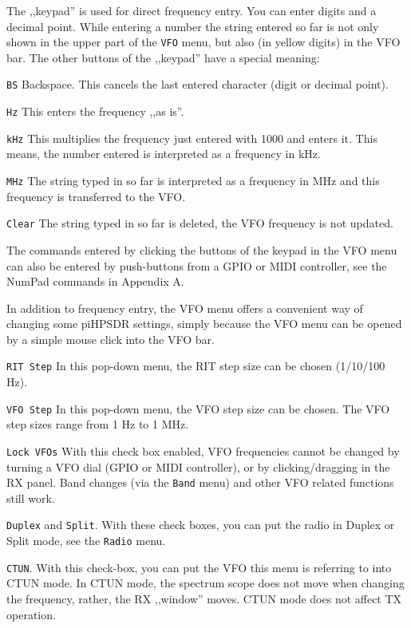 \documentclass[12pt]{book}
\def\rett#1{\texttt{\color{red}#1}}
\def\bltt#1{\texttt{\color{blue}#1}}
\def\pH{pi\-HPSDR\xspace}
\begin{document}
The ,,keypad'' is used for direct frequency entry. You can enter
digits and a decimal point. While entering a number the string
entered so far is not only shown in the upper part of the
\bltt{VFO} menu, but also (in yellow digits) in the VFO bar.
The other buttons of the ,,keypad'' have a special meaning:



\rett{BS} Backspace. This cancels the last entered character
(digit or decimal point).

\rett{Hz} This enters the frequency ,,as is''.

\rett{kHz} This multiplies the frequency just entered with 1000 and
enters it. This means, the number entered is interpreted as a
frequency in kHz.

\rett{MHz} The string typed in so far is interpreted as a frequency in MHz
and this frequency is transferred to the VFO.

\rett{Clear} The string typed in so far is deleted, the VFO frequency is not
updated.

The commands entered by clicking the buttons of the keypad in the VFO menu
can also be entered by push-buttons from a GPIO or MIDI controller, see
the NumPad commands in Appendix A.

In addition to frequency entry, the VFO menu offers a convenient way of changing
some \pH settings, simply because the VFO menu can be opened by a simple
mouse click into the VFO bar.

\rett{RIT Step} In this pop-down menu, the RIT step size can be chosen (1/10/100 Hz).

\rett{VFO Step} In this pop-down menu, the VFO step size can be chosen. The VFO step
sizes range from 1 Hz to 1 MHz.

\rett{Lock VFOs} With this check box enabled, VFO frequencies cannot be changed by
turning a VFO dial (GPIO or MIDI controller), or by clicking/dragging in the RX panel.
Band changes (via the \bltt{Band} menu) and other VFO related functions still work.

\rett{Duplex} and \rett{Split}. With these check boxes, you can put the radio
in Duplex or Split mode, see the \bltt{Radio} menu.

\rett{CTUN}. With this check-box, you can put the VFO this menu is referring to into
CTUN mode. In CTUN mode, the spectrum scope does not move when changing the frequency,
rather, the RX ,,window'' moves. CTUN mode does not affect TX operation.

\end{document}
